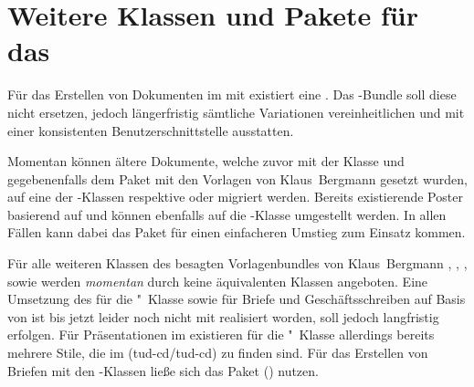 \section{Weitere Klassen und Pakete für das \CD}
\label{sec:tudclasses}%
Für das Erstellen von Dokumenten im \TUDCD mit  existiert eine 
. Das 
\TUDScript-Bundle soll diese nicht ersetzen, jedoch längerfristig sämtliche 
Variationen vereinheitlichen und mit einer konsistenten Benutzerschnittstelle 
ausstatten. 

Momentan können ältere Dokumente, welche zuvor mit der Klasse 
 und gegebenenfalls dem Paket 
 mit den Vorlagen von Klaus~Bergmann 
gesetzt wurden, auf eine der \TUDScript-Klassen  respektive 
 oder  migriert werden. Bereits 
existierende Poster basierend auf  und 
 können ebenfalls auf die 
\TUDScript-Klasse  umgestellt werden. In allen Fällen kann 
dabei das Paket  für einen einfacheren Umstieg zum Einsatz 
kommen. 

Für alle weiteren Klassen des besagten Vorlagenbundles von Klaus~Bergmann
, ,
,  sowie
 werden \emph{momentan} durch \TUDScript
keine äquivalenten Klassen angeboten.
%
Eine Umsetzung des \CDs für die "~Klasse sowie für Briefe und 
Geschäftsschreiben auf Basis von \KOMAScript{} ist bis jetzt leider noch nicht 
mit \TUDScript realisiert worden, soll jedoch langfristig erfolgen. Für 
Präsentationen im \TUDCD existieren für die "~Klasse allerdings 
bereits mehrere Stile, die im \GitHubRepo(tud-cd/tud-cd) zu finden sind. 
Für das Erstellen von Briefen mit den \TUDScript-Klassen ließe sich das Paket 
() nutzen.



